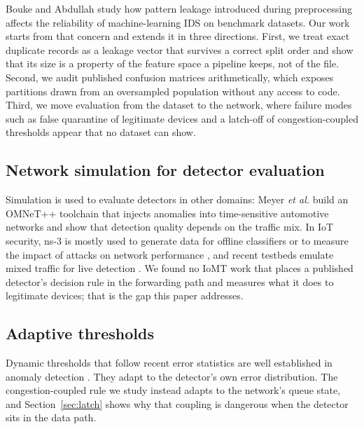 Bouke and Abdullah \cite{bouke2023} study how pattern leakage introduced during preprocessing affects the reliability of machine-learning IDS on benchmark datasets. Our work starts from that concern and extends it in three directions. First, we treat exact duplicate records as a leakage vector that survives a correct split order and show that its size is a property of the feature space a pipeline keeps, not of the file. Second, we audit published confusion matrices arithmetically, which exposes partitions drawn from an oversampled population without any access to code. Third, we move evaluation from the dataset to the network, where failure modes such as false quarantine of legitimate devices and a latch-off of congestion-coupled thresholds appear that no dataset can show.

\subsection{Network simulation for detector evaluation}
\noindent Simulation is used to evaluate detectors in other domains: Meyer \textit{et al.} \cite{meyer2024} build an OMNeT++ toolchain that injects anomalies into time-sensitive automotive networks and show that detection quality depends on the traffic mix. In IoT security, ns-3 is mostly used to generate data for offline classifiers \cite{chaudhari2023} or to measure the impact of attacks on network performance \cite{rajab2025}, and recent testbeds emulate mixed traffic for live detection \cite{rustam2025}. We found no IoMT work that places a published detector's decision rule in the forwarding path and measures what it does to legitimate devices; that is the gap this paper addresses.

\subsection{Adaptive thresholds}
\noindent Dynamic thresholds that follow recent error statistics are well established in anomaly detection \cite{hundman2018,yuan2024,ding2026}. They adapt to the detector's own error distribution. The congestion-coupled rule we study instead adapts to the network's queue state, and Section~\ref{sec:latch} shows why that coupling is dangerous when the detector sits in the data path.
